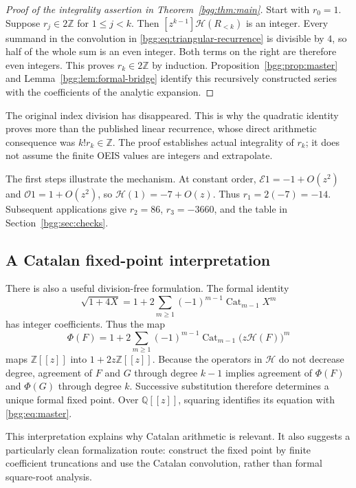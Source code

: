 \documentclass[11pt,a4paper]{article}
\numberwithin{equation}{section}
\theoremstyle{definition}
\theoremstyle{remark}
\theoremstyle{definition}
\newcommand{\Z}{\mathbb Z}
\newcommand{\Q}{\mathbb Q}
\newcommand{\Eop}{\mathcal E}
\newcommand{\Oop}{\mathcal O}
\newcommand{\Hop}{\mathcal H}
\newcommand{\Cat}{\operatorname{Cat}}
\begin{document}
\begin{proof}[Proof of the integrality assertion in Theorem~\ref{bgg:thm:main}]
Start with $r_0=1$. Suppose $r_j\in2\Z$ for $1\le j<k$. Then
$[z^{k-1}]\Hop(R_{<k})$ is an integer. Every summand in the convolution in
\eqref{bgg:eq:triangular-recurrence} is divisible by $4$, so half of the whole sum
is an even integer. Both terms on the right are therefore even integers.
This proves $r_k\in2\Z$ by induction. Proposition~\ref{bgg:prop:master} and
Lemma~\ref{bgg:lem:formal-bridge} identify this recursively constructed series
with the coefficients of the analytic expansion.
\end{proof}

The original index division has disappeared. This is why the quadratic
identity proves more than the published linear recurrence, whose direct
arithmetic consequence was $k!r_k\in\Z$. The proof establishes actual
integrality of $r_k$; it does not assume the finite OEIS values are integers
and extrapolate.

The first steps illustrate the mechanism. At constant order,
$\Eop1=-1+O(z^2)$ and $\Oop1=1+O(z^2)$, so
$\Hop(1)=-7+O(z)$. Thus $r_1=2(-7)=-14$.
Subsequent applications give $r_2=86$, $r_3=-3660$, and the table in
Section~\ref{bgg:sec:checks}.

\subsection{A Catalan fixed-point interpretation}

There is also a useful division-free formulation. The formal identity
\begin{equation}\label{bgg:eq:catalan-square-root}
 \sqrt{1+4X}=1+2\sum_{m\ge1}(-1)^{m-1}\Cat_{m-1}X^m
\end{equation}
has integer coefficients. Thus the map
\[
 \Phi(F)=1+2\sum_{m\ge1}(-1)^{m-1}\Cat_{m-1}
                 \bigl(z\Hop(F)\bigr)^m
\]
maps $\Z[[z]]$ into $1+2z\Z[[z]]$. Because the operators in
$\Hop$ do not decrease degree, agreement of $F$ and $G$ through degree $k-1$
implies agreement of $\Phi(F)$ and $\Phi(G)$ through degree $k$.
Successive substitution therefore determines a unique formal fixed point.
Over $\Q[[z]]$, squaring identifies its equation with \eqref{bgg:eq:master}.

This interpretation explains why Catalan arithmetic is relevant. It also
suggests a particularly clean formalization route: construct the fixed point
by finite coefficient truncations and use the Catalan convolution, rather
than formal square-root analysis.
\end{document}

